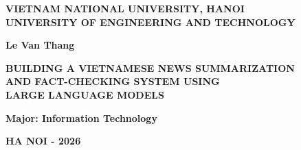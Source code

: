 \begin{titlepage}
\begin{center}

{\fontsize{12pt}{14pt}\selectfont\bfseries
VIETNAM NATIONAL UNIVERSITY, HANOI \\
UNIVERSITY OF ENGINEERING AND TECHNOLOGY}

\vspace{1.5cm}

{\fontsize{14pt}{16pt}\selectfont\bfseries
Le Van Thang}

\vspace{3cm}

{\fontsize{18pt}{22pt}\selectfont\bfseries
BUILDING A VIETNAMESE NEWS SUMMARIZATION \\
AND FACT-CHECKING SYSTEM USING \\
LARGE LANGUAGE MODELS}

\vspace{3cm}

{\fontsize{14pt}{16pt}\selectfont\bfseries
Major: Information Technology}

\vspace{2cm}

\begin{flushleft}
\end{flushleft}

\vfill

{\fontsize{12pt}{14pt}\selectfont\bfseries
HA NOI - 2026}

\end{center}
\end{titlepage}
